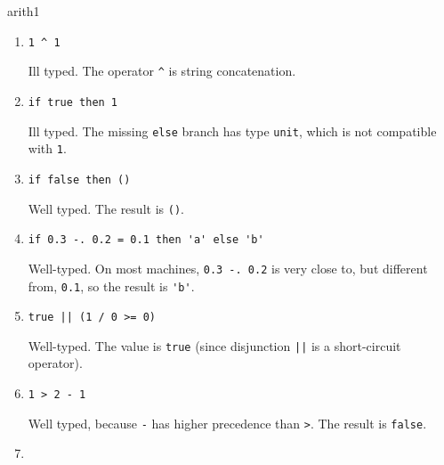 \begin{exercise}{arith1}
\begin{enumerate}
\item
\lstinline!1 ^ 1!

\begin{answer}\ifanswers
Ill typed.  The operator \hbox{\lstinline/^/} is string concatenation.
\fi\end{answer}

\item

\lstinline!if true then 1!

\begin{answer}\ifanswers
Ill typed.  The missing \hbox{\lstinline/else/} branch has type
\hbox{\lstinline/unit/}, which is not compatible with \hbox{\lstinline/1/}.
\fi\end{answer}

\item

\lstinline!if false then ()!

\begin{answer}\ifanswers
Well typed.  The result is \hbox{\lstinline/()/}.
\fi\end{answer}

\item

\lstinline!if 0.3 -. 0.2 = 0.1 then 'a' else 'b'!

\begin{answer}\ifanswers
Well-typed.  On most machines, \hbox{\lstinline/0.3 -. 0.2/} is very close to, but different from,
  \hbox{\lstinline/0.1/}, so the result is \hbox{\lstinline/'b'/}.
\fi\end{answer}

\item

\lstinline!true || (1 / 0 >= 0)!

\begin{answer}\ifanswers
Well-typed.  The value is \hbox{\lstinline/true/} (since disjunction
\hbox{\lstinline/||/} is a short-circuit operator).
\fi\end{answer}

\item

\lstinline!1 > 2 - 1!

\begin{answer}\ifanswers
Well typed, because \hbox{\lstinline/-/} has higher precedence than \hbox{\lstinline/>/}.
The result is \hbox{\lstinline/false/}.
\fi\end{answer}

\item


\end{enumerate}
\end{exercise}
